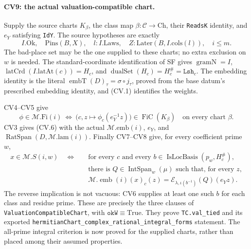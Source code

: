 \documentclass[11pt,a4paper]{article}
\numberwithin{equation}{section}
\theoremstyle{remark}\newtheorem{remark}[theorem]{Remark}
\begin{document}
\paragraph{CV9: the actual valuation-compatible chart.}
Supply the source charts \(K_\beta\), the class map
\(\beta:\mathcal C\to\mathrm{Ch}\), their \texttt{ReadsK}
identity, and \(e_Y\) satisfying \texttt{IdY}.
The source hypotheses are exactly
\[
 I.\mathrm{Ok},\quad\mathrm{Pins}(B,X),\quad
 l:I.\mathrm{Laws},\quad
 Z:\mathrm{Later}(B,I.\mathrm{cols}(l)),\quad i\le m.
                                                               \tag{CV.20}
\]
The bad-place set may be the one supplied to these
charts; no extra exclusion on \(w\) is needed.
The standard-coordinate identification of SF gives
\(\operatorname{gramN}=I\),
\(\operatorname{latCrd}(I.\mathrm{latAt}(c))=H_c\),
and \(\operatorname{dualSet}(H_c)=H_c^\#=\texttt{Lsh}_c\).
The embedding identity is the literal
\(\operatorname{embT}(D)_\tau=\sigma\circ j_\tau\),
proved from the base datum's prescribed embedding
identity, and (CV.1) identifies the weights.

CV4--CV5 give
\[
 \phi\in\mathcal M.\mathrm{Fi}(i)
 \ \Longleftrightarrow\
 \bigl(c,z\mapsto\phi_c(e_Y^{-1}z)\bigr)
       \in\operatorname{FiC}(K_\beta)
                   \quad\text{on every chart }\beta.         \tag{CV.21}
\]
CV3 gives (CV.6) with the actual
\(\mathcal M.\mathrm{emb}(i)\), \(e_Y\), and
\(\operatorname{RatSpan}(D,\mathcal M.\mathrm{lam}(i))\).
Finally CV7--CV8 give, for every coefficient prime \(w\),
\[
 \begin{split}
 x\in\mathcal M.S(i,w)
 \quad\Longleftrightarrow\quad
 &\text{for every }c\text{ and every }
    b\in\operatorname{IsLocBasis}(p_w,H_c^\#),\\
 &\text{there is }Q\in\operatorname{IntSpan}_w(\mu)
    \text{ such that, for every }z,\\[-2pt]
 &\mathcal M.\operatorname{emb}(i)(x)_c(z)
       =\mathcal E_{\lambda,\iota(b^{-1})}(Q)(e_Yz).
 \end{split}                                                   \tag{CV.22}
\]
The reverse implication is not vacuous: CV6 supplies at
least one such \(b\) for each class and residue prime.
These are precisely the three clauses of
\texttt{ValuationCompatibleChart}, with
\(\texttt{okW}\equiv\mathrm{True}\).
They prove \texttt{TC.val\_\allowbreak tied} and its exported
\texttt{hermitianChart\_\allowbreak complex\_\allowbreak rational\_\allowbreak integral\_\allowbreak forms}
statement. The all-prime integral criterion is now proved
for the supplied charts, rather than placed among their
assumed properties.
\end{document}
